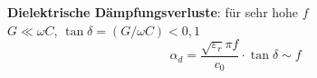 \textbf{Dielektrische Dämpfungsverluste}: für sehr hohe $ f $\\
	$G\ll\omega C$, \quad $\tan\delta= (G/\omega C) <0,1$
	\[
	\alpha_d = \frac{\sqrt{\varepsilon_r}\pi f}{c_0}\cdot\tan\delta \sim f
	\]
	

